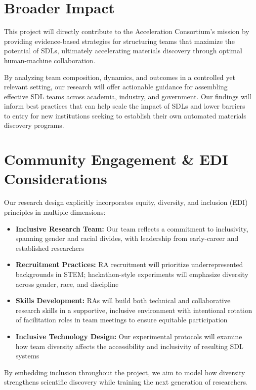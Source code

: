 \documentclass[11pt,letterpaper,twocolumn]{article}
\begin{document}
\section{Broader Impact}
This project will directly contribute to the Acceleration Consortium's mission by providing evidence-based strategies for structuring teams that maximize the potential of SDLs, ultimately accelerating materials discovery through optimal human-machine collaboration.

By analyzing team composition, dynamics, and outcomes in a controlled yet relevant setting, our research will offer actionable guidance for assembling effective SDL teams across academia, industry, and government. Our findings will inform best practices that can help scale the impact of SDLs and lower barriers to entry for new institutions seeking to establish their own automated materials discovery programs.

\section{Community Engagement \& EDI Considerations}
Our research design explicitly incorporates equity, diversity, and inclusion (EDI) principles in multiple dimensions:

\begin{itemize}
    \item \textbf{Inclusive Research Team:} Our team reflects a commitment to inclusivity, spanning gender and racial divides, with leadership from early-career and established researchers
    
    \item \textbf{Recruitment Practices:} RA recruitment will prioritize underrepresented backgrounds in STEM; hackathon-style experiments will emphasize diversity across gender, race, and discipline
    
    \item \textbf{Skills Development:} RAs will build both technical and collaborative research skills in a supportive, inclusive environment with intentional rotation of facilitation roles in team meetings to ensure equitable participation
    
    \item \textbf{Inclusive Technology Design:} Our experimental protocols will examine how team diversity affects the accessibility and inclusivity of resulting SDL systems
\end{itemize}

By embedding inclusion throughout the project, we aim to model how diversity strengthens scientific discovery while training the next generation of researchers.
\end{document}
